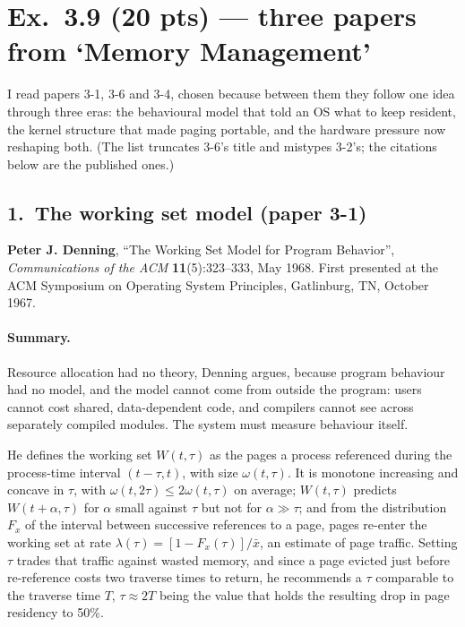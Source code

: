 \section*{Ex.~3.9 \quad (20 pts) --- three papers from `Memory Management'}

I read papers 3-1, 3-6 and 3-4, chosen because between them they follow one idea
through three eras: the behavioural model that told an OS what to keep resident, the kernel
structure that made paging portable, and the hardware pressure now reshaping both.
(The list truncates 3-6's title and mistypes 3-2's; the citations below are the
published ones.)

\subsection*{1.~The working set model (paper 3-1)}

\noindent\textbf{Peter J. Denning}, ``The Working Set Model for Program Behavior'',
\emph{Communications of the ACM} \textbf{11}(5):323--333, May 1968. First presented
at the ACM Symposium on Operating System Principles, Gatlinburg, TN, October 1967.

\paragraph{Summary.}
Resource allocation had no theory, Denning argues, because program behaviour had no model,
and the model cannot come from outside the program: users cannot cost shared,
data-dependent code, and compilers cannot see across separately compiled modules. The
system must measure behaviour itself.

He defines the working set $W(t,\tau)$ as the pages a process referenced during the
process-time interval $(t-\tau,t)$, with size $\omega(t,\tau)$. It is monotone increasing
and concave in $\tau$, with $\omega(t,2\tau)\le 2\omega(t,\tau)$ on average; $W(t,\tau)$
predicts $W(t+\alpha,\tau)$ for $\alpha$ small against $\tau$ but not for
$\alpha\gg\tau$; and from the distribution $F_x$ of the interval between successive
references to a page, pages re-enter the working set at rate
$\lambda(\tau)=[1-F_x(\tau)]/\bar{x}$, an estimate of page traffic.
Setting $\tau$ trades that traffic against wasted memory, and since a page evicted just
before re-reference costs two traverse times to return, he recommends a $\tau$ comparable
to the traverse time $T$, $\tau\approx 2T$ being the value that holds the resulting drop
in page residency to 50\%.

